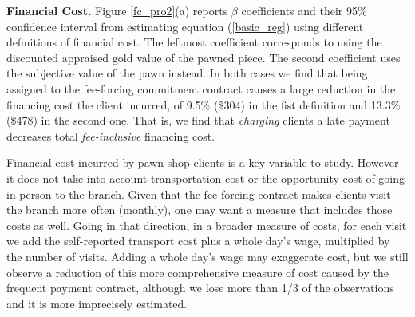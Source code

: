 \documentclass[oneside,11pt]{article}
\begin{document}
\vspace{.2in}
\noindent \textbf{Financial Cost.} Figure \ref{fc_pro2}(a) reports $\beta$ coefficients and their 95\% confidence interval from estimating equation (\ref{basic_reg}) using different definitions of financial cost. The leftmost coefficient corresponds to using the discounted appraised gold value of the pawned piece. The second coefficient uses the subjective value of the pawn instead. In both cases we find that being assigned to the fee-forcing commitment contract causes a large reduction in the financing cost the client incurred, of 9.5\% (\$304) in the fist definition and 13.3\% (\$478) in the second one. That is, we find that \textit{charging} clients a late payment decreases total \textit{fee-inclusive} financing cost. 

Financial cost incurred by pawn-shop clients is a key variable to study. However it does not take into account transportation cost or the opportunity cost of going in person to the branch. Given that the fee-forcing contract makes clients visit the branch more often (monthly), one may want a measure that includes those costs as well. Going in that direction, in a broader measure of costs, for each visit we add the self-reported transport cost plus a whole day's wage, multiplied by the number of visits. Adding a whole day's wage may exaggerate cost, but we still observe a reduction of this more comprehensive measure of cost caused by the frequent payment contract, although we lose more than 1/3 of the observations and it is more imprecisely estimated. 
\end{document}
